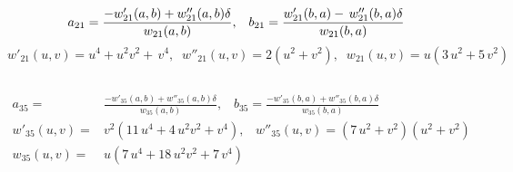 \begin{equation*}
    a_{21}=\frac{-w'_{21}(a,b)+ w''_{21}(a,b) \delta}{ w_{21}(a,b)},\;\;\;b_{21}=\frac{ w'_{21}(b,a)- \,  w''_{21}(b,a)\delta}{ w_{21}(b,a)}\\
\end{equation*}
{\small  
\begin{equation*}
w'_{21}(u,v)={u}^{4}+{u}^{2}{v}^{2}+ \,{v}^{4},\;\;w''_{21}(u,v)= 2( {u}^{2}+{v}^{2}),\;\;w_{21}(u,v)=u\left( 3\,{u}^{2}+5\,{v}^{2} \right)
\end{equation*}
}
\subsection{}


\begin{align*}
a_{35}=&\frac{-w'_{35}(a,b)+w''_{35}(a,b) \delta}{w_{35}(a,b)},\;\;\;b_{35}=\frac{-w'_{35}(b,a)+w''_{35}(b,a)\delta}{w_{35}(b,a)} \\
w'_{35}(u,v)=&v^2( 11\,{u}^{4}+4\,{u}^{2}{v}^{2}+{v}^{4} ),\;\;\;w''_{35}(u,v)=\left( 7\,{u}^{2}+{v}^{2} \right)  \left( {u}^{2}+{v}^{2}\right)\\
w_{35}(u,v)=& u(7\,{u}^{4}+18\,{u}^{2}{v}^{2}+7\,{v}^{4} )
\end{align*}

\subsection{}

